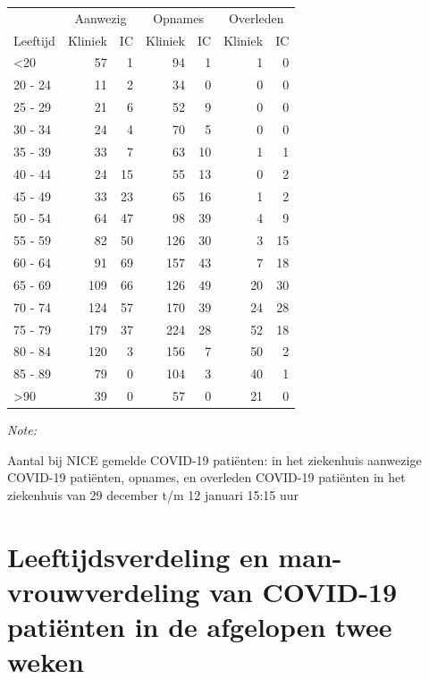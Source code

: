 \documentclass[
  english,
  man,floatsintext]{apa6}
\begin{document}
\begin{table}
\centering\begingroup\fontsize{10}{12}\selectfont

\begin{threeparttable}
\begin{tabular}{lrrrrrr}
\toprule
\multicolumn{1}{c}{ } & \multicolumn{2}{c}{Aanwezig} & \multicolumn{2}{c}{Opnames} & \multicolumn{2}{c}{Overleden} \\
\cmidrule(l{3pt}r{3pt}){2-3} \cmidrule(l{3pt}r{3pt}){4-5} \cmidrule(l{3pt}r{3pt}){6-7}
Leeftijd & Kliniek & IC & Kliniek & IC & Kliniek & IC\\
\midrule
<20 & 57 & 1 & 94 & 1 & 1 & 0\\
20 - 24 & 11 & 2 & 34 & 0 & 0 & 0\\
25 - 29 & 21 & 6 & 52 & 9 & 0 & 0\\
30 - 34 & 24 & 4 & 70 & 5 & 0 & 0\\
35 - 39 & 33 & 7 & 63 & 10 & 1 & 1\\
40 - 44 & 24 & 15 & 55 & 13 & 0 & 2\\
45 - 49 & 33 & 23 & 65 & 16 & 1 & 2\\
50 - 54 & 64 & 47 & 98 & 39 & 4 & 9\\
55 - 59 & 82 & 50 & 126 & 30 & 3 & 15\\
60 - 64 & 91 & 69 & 157 & 43 & 7 & 18\\
65 - 69 & 109 & 66 & 126 & 49 & 20 & 30\\
70 - 74 & 124 & 57 & 170 & 39 & 24 & 28\\
75 - 79 & 179 & 37 & 224 & 28 & 52 & 18\\
80 - 84 & 120 & 3 & 156 & 7 & 50 & 2\\
85 - 89 & 79 & 0 & 104 & 3 & 40 & 1\\
>90 & 39 & 0 & 57 & 0 & 21 & 0\\
\bottomrule
\end{tabular}
\begin{tablenotes}
\item \textit{Note: } 
\item Aantal bij NICE gemelde COVID-19 patiënten: in het ziekenhuis aanwezige COVID-19 patiënten, opnames, en overleden COVID-19 patiënten in het ziekenhuis van 29 december t/m 12 januari 15:15 uur
\end{tablenotes}
\end{threeparttable}
\endgroup{}
\end{table}

\newpage

\hypertarget{leeftijdsverdeling-en-man-vrouwverdeling-van-covid-19-patiuxebnten-in-de-afgelopen-twee-weken}{%
\section{Leeftijdsverdeling en man-vrouwverdeling van COVID-19 patiënten in de afgelopen twee weken}\label{leeftijdsverdeling-en-man-vrouwverdeling-van-covid-19-patiuxebnten-in-de-afgelopen-twee-weken}}
\end{document}
